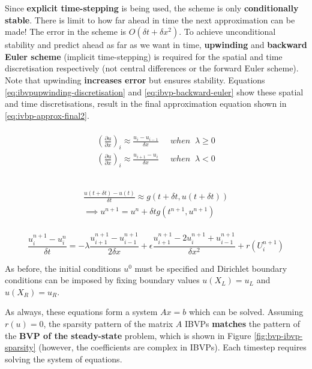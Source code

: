 \documentclass{article}
\begin{document}
Since \textbf{explicit time-stepping} is being used, the scheme is only \textbf{conditionally stable}. There is limit to how far ahead in time the next approximation can be made! The error in the scheme is $O(\delta t + \delta x^2)$. To achieve unconditional stability and predict ahead as far as we want in time, \textbf{upwinding} and \textbf{backward Euler scheme} (implicit time-stepping) is required for the spatial and time discretisation respectively (not central differences or the forward Euler scheme). Note that upwinding \textbf{increases error} but ensures stability. Equations \ref{eq:ibvpupwinding-discretisation} and \ref{eq:ibvp-backward-euler} show these spatial and time discretisations, result in the final approximation equation shown in \ref{eq:ivbp-approx-final2}.

\begin{multline}\\
	{\left( \frac{\partial u}{\partial x} \right)}_i \approx \frac{u_i - u_{i - 1}}{\delta x} \;\;\;\;\; when \;\; \lambda \geq 0 \\
	{\left( \frac{\partial u}{\partial x} \right)}_i \approx \frac{u_{i+1} - u_{i}}{\delta x} \;\;\;\;\; when \;\; \lambda < 0 \\
	\label{eq:ibvpupwinding-discretisation} 
\\ \end{multline}

\begin{multline}\\
	\frac{u(t + \delta t) - u(t)}{\delta t} \approx g(t + \delta t, u(t + \delta t)) \\
	\implies u^{n+1}= u^n + \delta t g(t^{n+1}, u^{n+1})
	\label{eq:ibvp-backward-euler}
\\ \end{multline}

\begin{equation}
	\frac{u_i^{n + 1} - u_i^n}{\delta t} = -\lambda \frac{u_{i+1}^{n+1} - u_{i-1}^{n+1}}{2 \delta x} + \epsilon \frac{u_{i+1}^{n+1} - 2u_{i}^{n+1} + u_{i-1}^{n+1}}{\delta x^2} + r(U_i^{n+1})
	\label{eq:ivbp-approx-final2}
\end{equation}

As before, the initial conditions $u^0$ must be specified and Dirichlet boundary conditions can be imposed by fixing boundary values $u(X_L) = u_L$ and $u(X_R) = u_R$. 

As always, these equations form a system $Ax = b$ which can be solved. Assuming $r(u) = 0$, the sparsity pattern of the matrix $A$ IBVPs \textbf{matches} the pattern of the \textbf{BVP of the steady-state} problem, which is shown in Figure \ref{fig:bvp-ibvp-sparsity} (however, the coefficients are complex in IBVPs). Each timestep requires solving the system of equations.
\end{document}
